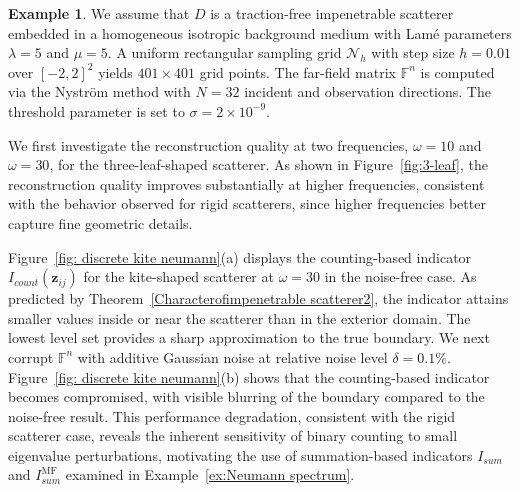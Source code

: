 \documentclass[11pt,reqno,twoside]{amsart}
\theoremstyle{definition}
\newtheorem{example}{Example}[section]
\theoremstyle{remark}
\numberwithin{equation}{section}
\begin{document}
\begin{example}\label{ex:Neumann discrete}
We assume that $D$ is a traction-free impenetrable scatterer embedded in a homogeneous isotropic background medium with Lam\'{e} parameters $\lambda = 5$ and $\mu = 5$. A uniform rectangular sampling grid $\mathcal{N}_h$ with step size $h = 0.01$ over $[-2,2]^2$ yields $401\times 401$ grid points. The far-field matrix $\mathbb{F}^n$ is computed via the Nystr\"{o}m method with $N = 32$ incident and observation directions. The threshold parameter is set to $\sigma = 2 \times 10^{-9}$.

We first investigate the reconstruction quality at two frequencies, $\omega = 10$ and $\omega = 30$, for the three-leaf-shaped scatterer. As shown in Figure~\ref{fig:3-leaf}, the reconstruction quality improves substantially at higher frequencies, consistent with the behavior observed for rigid scatterers, since higher frequencies better capture fine geometric details.

Figure~\ref{fig: discrete kite neumann}(a) displays the counting-based indicator $I_{count}(\mathbf{z}_{ij})$ for the kite-shaped scatterer at $\omega = 30$ in the noise-free case. As predicted by Theorem~\ref{Characterofimpenetrable scatterer2}, the indicator attains smaller values inside or near the scatterer than in the exterior domain. The lowest level set provides a sharp approximation to the true boundary.
We next corrupt $\mathbb{F}^n$ with additive Gaussian noise at relative noise level $\delta = 0.1\%$. Figure~\ref{fig: discrete kite neumann}(b) shows that the counting-based indicator becomes compromised, with visible blurring of the boundary compared to the noise-free result. This performance degradation, consistent with the rigid scatterer case, reveals the inherent sensitivity of binary counting to small eigenvalue perturbations, motivating the use of summation-based indicators $I_{sum}$ and $I_{sum}^{\mathrm{MF}}$ examined in Example~\ref{ex:Neumann spectrum}.

\end{example}
\end{document}
